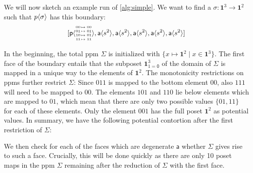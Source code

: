 \documentclass[11pt]{article}
\theoremstyle{definition}
\newcommand{\continuation}{??}
\newenvironment{examplecontd}[1]
{\renewcommand{\continuation}{\ref{#1}}\expcont[continued]}
{\endexpcont}
\newcommand{\mlist}[1]{[ {#1} ]}
\newcommand{\pint}[1]{\mathbf{1}^{#1}}
\newcommand{\pintrestr}[3]{\mathbf{1}^{#1}_{{#2}={#3}}}
\newcommand{\izero}{\mathsf{0}}
\newcommand{\smap}[1]{s^{{#1}}}
\newcommand{\cont}[2]{\ensuremath{ \ifthenelse{\equal{#2}{}}{#1}{{#1}\langle{#2}\rangle}} }
\newcommand{\cset}[1]{\ensuremath{\mathsf{{#1}}}}
\newcommand{\substfour}[4]{\tiny
  \arraycolsep=.4pt\def\arraystretch{1}
  \begin{array}{ll}
    00 &\mapsto {#1} \\
    01 &\mapsto {#2} \\
    10 &\mapsto {#3} \\
    11 &\mapsto {#4} 
  \end{array}
}
\begin{document}
\begin{examplecontd}{exp:sndsphere}

  We will now sketch an example run of \autoref{alg:simple}. We want to find a
  $\sigma : \pint{3} \to \pint{2}$ such that $\cont{p}{\sigma}$ has this boundary:
$$\mlist{ \cont{\cset{p}}{\substfour{00}{01}{01}{11}} ,
  \cont{\cset{a}}{\smap{2}} , \cont{\cset{a}}{\smap{2}} ,
  \cont{\cset{a}}{\smap{2}} , \cont{\cset{a}}{\smap{2}} ,
  \cont{\cset{a}}{\smap{2}}}$$

In the beginning, the total ppm $\Sigma$ is initialized with $\{ x \mapsto
\pint{2} \mid x \in \pint{3}\}$.
The first face of the boundary entails that the subposet $\pintrestr{3}{1}{\izero}$
of the domain of $\Sigma$
is mapped in a unique way to the elements of $\pint{2}$. The monotonicity
restrictions on ppms further restrict $\Sigma$: Since $011$ is mapped to the
bottom element $00$, also $111$ will need to be mapped to $00$. The elements
$101$ and $110$ lie below elements which are mapped to $01$, which mean that
there are only two possible values $\{01, 11\}$ for each of these elements. Only
the element $001$ has the full poset $\pint{2}$ as potential values. In summary,
we have the following potential contortion after the first restriction of $\Sigma$:

\begin{center}
\end{center}

We then check for each of the faces which are degenerate \cset{a} whether
$\Sigma$ gives rise to such a face. Crucially, this will be done quickly as
there are only 10 poset maps in the ppm $\Sigma$ remaining after the reduction
of $\Sigma$ with the first face.

\end{examplecontd}
\end{document}
